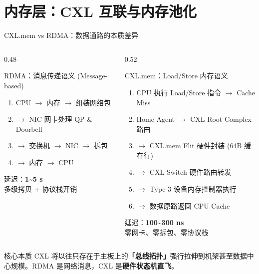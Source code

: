\documentclass[aspectratio=169, 10pt, UTF8]{ctexbeamer}
\begin{document}
\section{内存层：CXL 互联与内存池化}

\begin{frame}{CXL.mem vs RDMA：数据通路的本质差异}
  \begin{columns}[T]
    \begin{column}{0.48\textwidth}
      \begin{alertblock}{RDMA：消息传递语义 (Message-based)}
        \begin{enumerate}
          \item CPU $\to$ 内存 $\to$ 组装网络包
          \item $\to$ NIC 网卡处理 QP \& Doorbell
          \item $\to$ 交换机 $\to$ NIC $\to$ 拆包
          \item $\to$ 内存 $\to$ CPU
        \end{enumerate}
        \vspace{4pt}
        \centering
        延迟：\textbf{1\textasciitilde5 \textmu s}\\[2pt]
        多级拷贝 + 协议栈开销
      \end{alertblock}
    \end{column}
    \begin{column}{0.52\textwidth}
      \begin{exampleblock}{CXL.mem：Load/Store 内存语义}
        \begin{enumerate}
          \item CPU 执行 Load/Store 指令 $\to$ Cache Miss
          \item Home Agent $\to$ CXL Root Complex 路由
          \item $\to$ CXL.mem Flit 硬件封装 (64B 缓存行)
          \item $\to$ CXL Switch 硬件路由转发
          \item $\to$ Type-3 设备内存控制器执行
          \item $\to$ 数据原路返回 CPU Cache
        \end{enumerate}
        \vspace{4pt}
        \centering
        延迟：\textbf{100\textasciitilde300 ns}\\[2pt]
        零网卡、零拆包、零协议栈
      \end{exampleblock}
    \end{column}
  \end{columns}

  \vspace{6pt}
  \begin{block}{核心本质}
    CXL 将以往只存在于主板上的\textbf{「总线拓扑」}强行拉伸到机架甚至数据中心规模。RDMA 是网络消息，CXL 是\textbf{硬件状态机直飞}。
  \end{block}
\end{frame}
\end{document}
